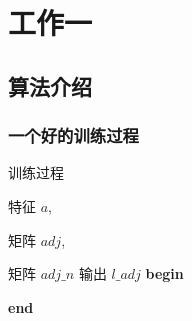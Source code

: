 \chapter{工作一}

\section{算法介绍}

\subsection{一个好的训练过程}
\begin{algorithm}[!htp]
  \caption{训练过程}\label{alg_train}
  \begin{algorithmic}[1]
  \REQUIRE 特征 $a$,\par 
           矩阵 $adj$,\par 
           矩阵 $adj\_n$                  %
  \ENSURE 输出 $l\_adj$     %
  \STATE \textbf{begin}
  
  \STATE \textbf{end}
  \end{algorithmic}
  \end{algorithm}

